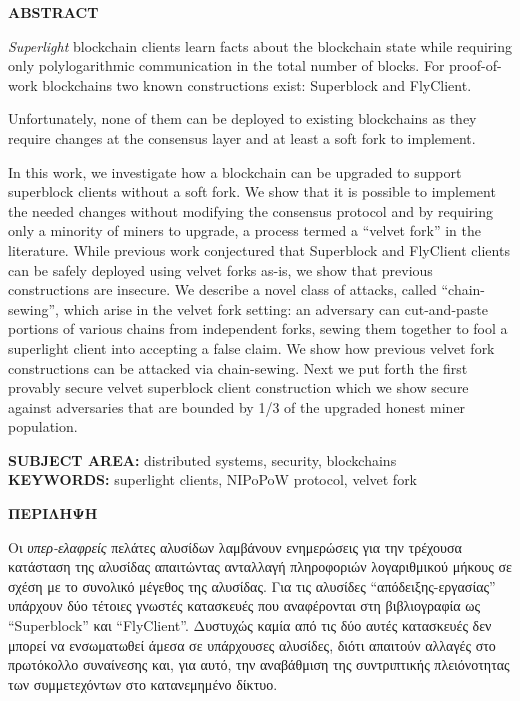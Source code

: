 \begin{center}
\large{\textbf{ABSTRACT}}
\end{center}
{\em Superlight} blockchain clients
learn facts about the blockchain state
while requiring only polylogarithmic communication in the total
number of blocks.
For proof-of-work blockchains
two known constructions exist: Superblock and FlyClient.

Unfortunately, none of them can be deployed to existing blockchains as they require changes at the consensus layer and at least a soft fork to implement.

In this work, we
investigate how a blockchain can be upgraded to support superblock clients without a soft fork. We show that it is possible to implement the needed changes without modifying the consensus protocol and by requiring only a minority of miners to upgrade, a process termed a ``velvet fork'' in the literature. While previous work conjectured that Superblock and FlyClient clients can be safely deployed using velvet forks as-is, we show that previous constructions are insecure. We describe a novel class of attacks, called  ``chain-sewing'', which arise in the velvet fork setting: an adversary can cut-and-paste portions of various chains from independent forks, sewing them together to
fool a superlight client into accepting a false claim.
We show how previous velvet fork constructions can be attacked via chain-sewing.
Next we put forth the first provably secure velvet superblock client construction which we show  secure against adversaries that are bounded by 1/3 of the upgraded honest miner population.

\vspace{11cm}
\noindent
\textbf{SUBJECT AREA:} distributed systems, security, blockchains\\
\textbf{KEYWORDS:} superlight clients, NIPoPoW protocol, velvet fork

\newpage
\begin{center}
\large{\textbf{ΠΕΡIΛΗΨΗ}}
\end{center}
Οι \emph{υπερ-ελαφρείς} πελάτες αλυσίδων λαμβάνουν ενημερώσεις για την τρέχουσα κατάσταση της αλυσίδας απαιτώντας ανταλλαγή πληροφοριών λογαριθμικού μήκους σε σχέση με το συνολικό μέγεθος της αλυσίδας. Για τις αλυσίδες ``απόδειξης-εργασίας'' υπάρχουν δύο τέτοιες γνωστές κατασκευές που αναφέρονται στη βιβλιογραφία ως ``Superblock'' και ``FlyClient''. Δυστυχώς καμία από τις δύο αυτές κατασκευές δεν μπορεί να ενσωματωθεί άμεσα σε υπάρχουσες αλυσίδες, διότι απαιτούν αλλαγές στο πρωτόκολλο συναίνεσης και, για αυτό, την αναβάθμιση της συντριπτικής πλειόνοτητας των συμμετεχόντων στο κατανεμημένο δίκτυο. 

